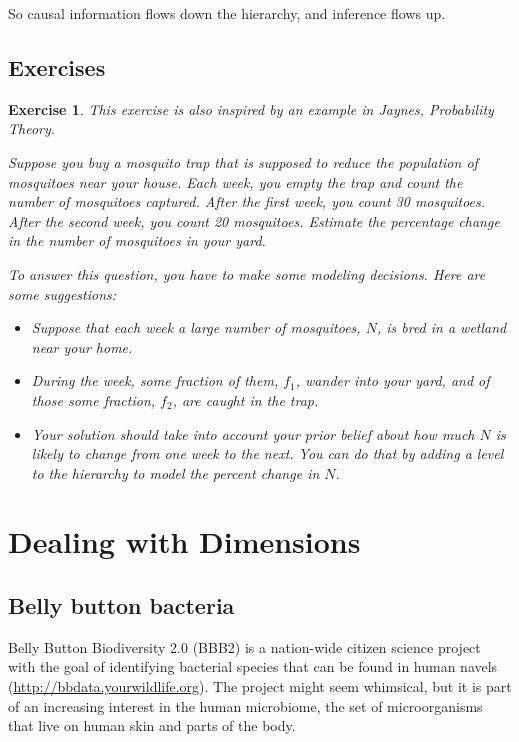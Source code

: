 \documentclass[12pt]{book}
\theoremstyle{exercise}
\newtheorem{exercise}{Exercise}[chapter]
\begin{document}
So causal information flows down the hierarchy, and inference flows
up.


\section{Exercises}

\begin{exercise}
This exercise is also inspired by an example in Jaynes, {\em
Probability Theory}.

Suppose you buy a mosquito trap that is supposed to reduce the
population of mosquitoes near your house.  Each
week, you empty the trap and count the number of mosquitoes
captured.  After the first week, you count 30 mosquitoes.
After the second week, you count 20 mosquitoes.  Estimate the
percentage change in the number of mosquitoes in your yard.

To answer this question, you have to make some modeling
decisions.  Here are some suggestions:

\begin{itemize}

\item Suppose that each week a large number of mosquitoes, $N$, is bred
in a wetland near your home.

\item During the week, some fraction of
them, $f_1$, wander into your yard, and of those some fraction, $f_2$,
are caught in the trap.

\item Your solution should take into account your prior belief
about how much $N$ is likely to change from one week to the next.
You can do that by adding a level to the hierarchy to
model the percent change in $N$.

\end{itemize}

\end{exercise}


\chapter{Dealing with Dimensions}
\label{species}

\section{Belly button bacteria}

Belly Button Biodiversity 2.0 (BBB2) is a nation-wide citizen
science project with the goal of identifying bacterial species that
can be found in human navels (\url{http://bbdata.yourwildlife.org}).
The project might seem whimsical, but it is part of an increasing
interest in the human microbiome, the set of microorganisms that live
on human skin and parts of the body.
\end{document}
